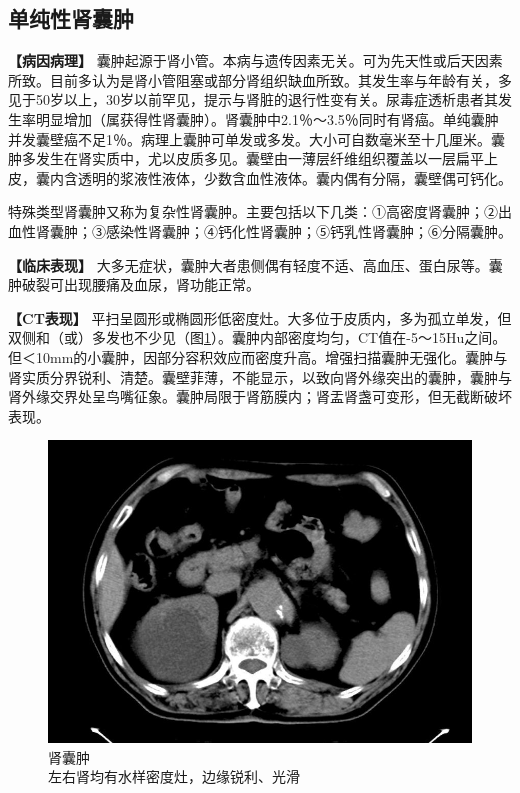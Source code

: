 \subsection{单纯性肾囊肿}

\textbf{【病因病理】}
囊肿起源于肾小管。本病与遗传因素无关。可为先天性或后天因素所致。目前多认为是肾小管阻塞或部分肾组织缺血所致。其发生率与年龄有关，多见于50岁以上，30岁以前罕见，提示与肾脏的退行性变有关。尿毒症透析患者其发生率明显增加（属获得性肾囊肿）。肾囊肿中2.1％～3.5％同时有肾癌。单纯囊肿并发囊壁癌不足1％。病理上囊肿可单发或多发。大小可自数毫米至十几厘米。囊肿多发生在肾实质中，尤以皮质多见。囊壁由一薄层纤维组织覆盖以一层扁平上皮，囊内含透明的浆液性液体，少数含血性液体。囊内偶有分隔，囊壁偶可钙化。

特殊类型肾囊肿又称为复杂性肾囊肿。主要包括以下几类：①高密度肾囊肿；②出血性肾囊肿；③感染性肾囊肿；④钙化性肾囊肿；⑤钙乳性肾囊肿；⑥分隔囊肿。

\textbf{【临床表现】}
大多无症状，囊肿大者患侧偶有轻度不适、高血压、蛋白尿等。囊肿破裂可出现腰痛及血尿，肾功能正常。

\textbf{【CT表现】}
平扫呈圆形或椭圆形低密度灶。大多位于皮质内，多为孤立单发，但双侧和（或）多发也不少见（图\ref{fig15-15}）。囊肿内部密度均匀，CT值在-5～15Hu之间。但＜10mm的小囊肿，因部分容积效应而密度升高。增强扫描囊肿无强化。囊肿与肾实质分界锐利、清楚。囊壁菲薄，不能显示，以致向肾外缘突出的囊肿，囊肿与肾外缘交界处呈鸟嘴征象。囊肿局限于肾筋膜内；肾盂肾盏可变形，但无截断破坏表现。

\begin{figure}[!htbp]
 \centering
 \includegraphics[width=.7\textwidth,height=\textheight,keepaspectratio]{./images/Image00331.jpg}
 \captionsetup{justification=centering}
 \caption{肾囊肿\\{\small 左右肾均有水样密度灶，边缘锐利、光滑}}
 \label{fig15-15}
  \end{figure} 

